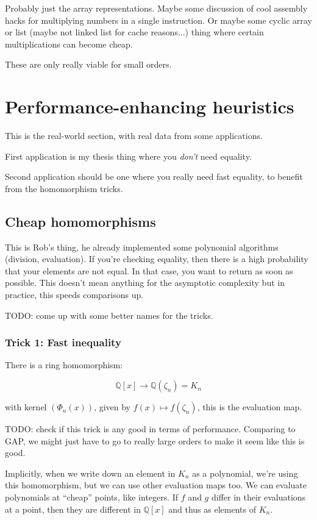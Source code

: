 \documentclass{article}
\begin{document}
Probably just the array representations. Maybe some discussion of cool
assembly hacks for multiplying numbers in a single instruction. Or
maybe some cyclic array or list (maybe not linked list for cache
reasons...) thing where certain multiplications can become cheap.

These are only really viable for small orders.

\section{Performance-enhancing heuristics}

This is the real-world section, with real data from some applications.

First application is my thesis thing where you \emph{don't} need
equality.

Second application should be one where you really need fast equality,
to benefit from the homomorphism tricks.

\subsection{Cheap homomorphisms}

This is Rob's thing, he already implemented some polynomial algorithms
(division, evaluation). If you're checking equality, then there is a
high probability that your elements are not equal. In that case, you
want to return as soon as possible. This doesn't mean anything for the
asymptotic complexity but in practice, this speeds comparisons up.

TODO: come up with some better names for the tricks.

\subsubsection{Trick 1: Fast inequality}

There is a ring homomorphism:

$$\mathbb{Q}[x] \to \mathbb{Q}(\zeta_n) = K_n$$

with kernel $(\Phi_n(x))$, given by $f(x) \mapsto f(\zeta_n)$, this is
the evaluation map.

TODO: check if this trick is any good in terms of
performance. Comparing to GAP, we might just have to go to really
large orders to make it seem like this is good.

Implicitly, when we write down an element in $K_n$ as a polynomial,
we're using this homomorphism, but we can use other evaluation maps
too. We can evaluate polynomials at ``cheap'' points, like
integers. If $f$ and $g$ differ in their evaluations at a point, then
they are different in $\mathbb{Q}[x]$ and thus as elements of $K_n$.
\end{document}
